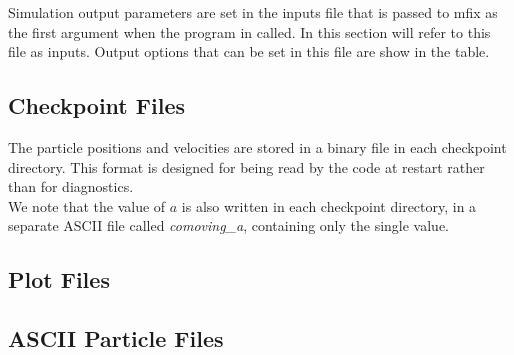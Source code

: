Simulation output parameters are set in the inputs file that is passed to mfix
as the first argument when the program in called. In this section will refer
to this file as {\sf inputs}. Output options that can be set in this file are 
show in the table.  

\subsection{Checkpoint Files}

The particle positions and velocities are stored in a binary file in each checkpoint directory.  
This format is designed for being read by the code at restart rather than for diagnostics. \\

We note that the value of $a$ is also written in each checkpoint directory, 
in a separate ASCII file called {\em comoving\_a}, containing only the single value. \\

\subsection{Plot Files}



%
%
%
%

\subsection{ASCII Particle Files}

